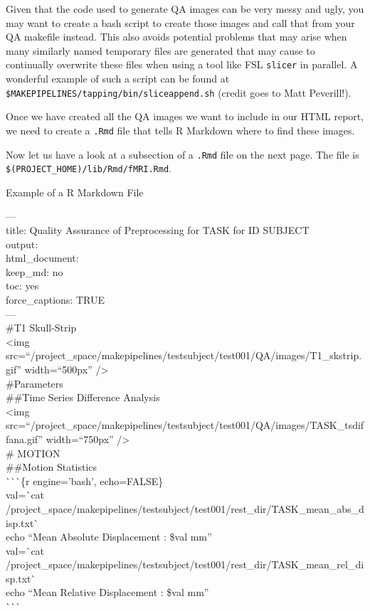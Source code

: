 Given that the code used to generate QA images can be very messy and ugly, you may want to create a bash script to create those images and call that from your QA makefile instead. This also avoids potential problems that may arise when many similarly named temporary files are generated that may cause \maken{} to continually overwrite these files when using a tool like FSL \texttt{slicer} in parallel. A wonderful example of such a script can be found at \texttt{\$MAKEPIPELINES/tapping/bin/sliceappend.sh} (credit goes to Matt Peverill!). 

Once we have created all the QA images we want to include in our HTML report, we need to create a \texttt{.Rmd} file that tells R Markdown where to find these images. 

Now let us have a look at a subsection of a \texttt{.Rmd} file on the next page. The file is \texttt{\$(PROJECT\_HOME)/lib/Rmd/fMRI.Rmd}. 
\clearpage

\begin{bash}{Example of a R Markdown File}{}

--- \\
title: Quality Assurance of Preprocessing for TASK for ID SUBJECT \\
output: \\
  html\_document: \\
    keep\_md: no \\
    toc: yes \\
    force\_captions: TRUE \\
--- \\
\#T1 Skull-Strip \\

<img src=``/project\_space/makepipelines/testsubject/test001/QA/images/T1\_skstrip.gif'' width=``500px'' /> \\

\#Parameters \\

\#\#Time Series Difference Analysis \\

<img src=``/project\_space/makepipelines/testsubject/test001/QA/images/TASK\_tsdiffana.gif'' width=``750px'' /> \\

\# MOTION \\

\#\#Motion Statistics \\

\`{}\`{}\`{}\{r engine='bash', echo=FALSE\} \\
val=\`{}cat /project\_space/makepipelines/testsubject/test001/rest\_dir/TASK\_mean\_abs\_disp.txt\`{} \\
echo ``Mean Absolute Displacement : \$val mm'' \\
val=\`{}cat /project\_space/makepipelines/testsubject/test001/rest\_dir/TASK\_mean\_rel\_disp.txt\`{} \\
echo ``Mean Relative Displacement : \$val mm'' \\
\`{}\`{}\`{} \\

\end{bash}

